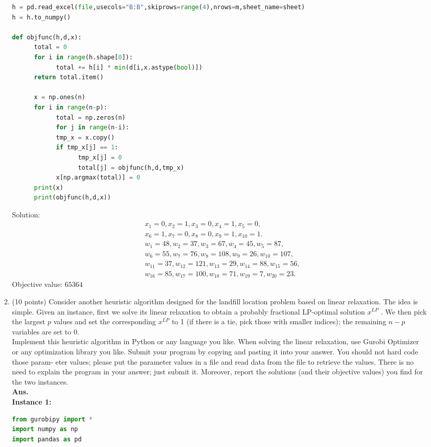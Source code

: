 \documentclass[12pt]{article}
\begin{document}
\begin{enumerate}
\begin{enumerate}
\begin{lstlisting}[language=Python]
h = pd.read_excel(file,usecols="B:B",skiprows=range(4),nrows=m,sheet_name=sheet)
h = h.to_numpy()

def objfunc(h,d,x):
      total = 0
      for i in range(h.shape[0]):
            total += h[i] * min(d[i,x.astype(bool)])
      return total.item()

      x = np.ones(n)
      for i in range(n-p):
            total = np.zeros(n)
            for j in range(n-i):
            tmp_x = x.copy()
            if tmp_x[j] == 1:
                  tmp_x[j] = 0
                  total[j] = objfunc(h,d,tmp_x)
            x[np.argmax(total)] = 0
      print(x)
      print(objfunc(h,d,x))    
                  \end{lstlisting}
                  Solution:
                  \begin{align*}
                        &x_1 = 0, x_2 = 1, x_3 = 0, x_4 = 1, x_5 = 0,\\
                        &x_6 = 1, x_7 = 0, x_8 = 0, x_9 = 1, x_{10} = 1.\\
                        &w_1 = 48, w_2 = 37, w_3 = 67, w_4 = 45, w_5 = 87,\\
                        &w_6 = 55, w_7 = 76, w_8 = 108, w_9 = 26, w_{10} = 107,\\
                        &w_{11} = 37, w_{12} = 121, w_{13} = 29, w_{14} = 88, w_{15} = 56,\\
                        &w_{16} = 85, w_{17} = 100, w_{18} = 71, w_{19} = 7, w_{20} = 23.
                  \end{align*}
                  Objective value:  $65364$                             
                  \item (10 points) Consider another heuristic algorithm designed for the landfill location problem
                        based on linear relaxation. The idea is simple. Given an instance, first we solve its linear
                        relaxation to obtain a probably fractional LP-optimal solution $x^{LP}$ . We then pick the largest
                        $p$ values and set the corresponding $x^{LP}$ to 1 (if there is a tie, pick those with smaller indices);
                        the remaining $n - p$ variables are set to 0.\\
                        Implement this heuristic algorithm in Python or any language you like. When solving the linear relaxation, use Gurobi Optimizer or any optimization library you like. Submit your program by copying and pasting it into your answer. You should not hard code those param- eter values; please put the parameter values in a file and read data from the file to retrieve the values. There is no need to explain the program in your answer; just submit it. Moreover, report the solutions (and their objective values) you find for the two instances.\\
                        \textbf{Ans.}\\
                        \textbf{Instance 1:}
                        \begin{lstlisting}[language=Python]
from gurobipy import *
import numpy as np
import pandas as pd


\end{lstlisting}
\end{enumerate}
\end{enumerate}
\end{document}
